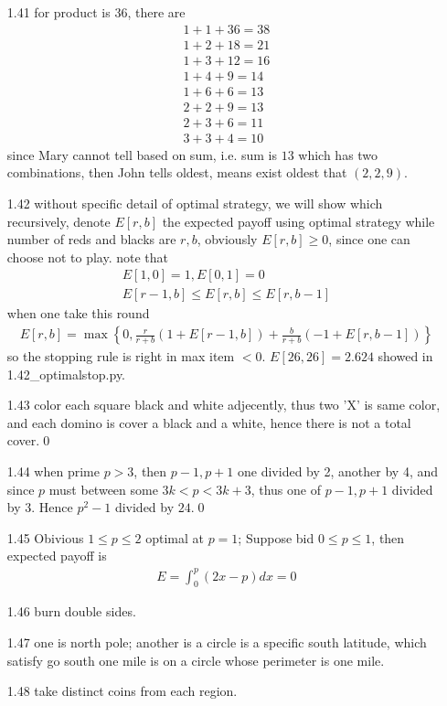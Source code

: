\documentclass[paper=a4, fontsize=11pt]{scrartcl} %
\numberwithin{equation}{section} %
\numberwithin{figure}{section} %
\numberwithin{table}{section} %
\begin{document}
\begin{itemize}
	\item[1.41] for product is 36, there are 
	\begin{align}
		1+1+36=38\\
		1+2+18=21\\
		1+3+12=16\\
		1+4+9=14\\
		1+6+6=13\\
		2+2+9=13\\
		2+3+6=11\\
		3+3+4=10
	\end{align}
	since Mary cannot tell based on sum, i.e. sum is $13$ which has two combinations, then John tells oldest, means exist oldest that $(2,2,9)$.
	\item[1.42] without specific detail of optimal strategy, we will show which recursively, denote $E[r,b]$ the expected payoff using optimal strategy while number of reds and blacks are $r,b$, obviously $E[r,b]\geq 0$, since one can choose not to play. note that
	\begin{align}
		E[1,0]=1, E[0,1]=0\\
		E[r-1,b]\leq E[r,b]\leq E[r,b-1]
	\end{align}	
	when one take this round
	\begin{align}
		E[r,b] = \max\left\{0, \frac{r}{r+b}\left(1+E[r-1,b]\right) + \frac{b}{r+b}\left(-1+E[r,b-1]\right)\right\}
	\end{align}
	so the stopping rule is right in max item $<0$. $E[26,26]= 2.624$ showed in 1.42\_optimalstop.py.
	\item[1.43] color each square black and white adjecently, thus two 'X' is same color, and each domino is cover a black and a white, hence there is not a total cover.\qed
	\item[1.44] when prime $p>3$, then $p-1,p+1$ one divided by 2, another by 4, and since $p$ must between some $3k<p<3k+3$, thus one of $p-1,p+1$ divided by 3. Hence $p^2-1$ divided by $24$.\qed
	\item[1.45] Obivious $1\leq p\leq 2$ optimal at $p=1$; Suppose bid $0\leq p\leq 1$, then expected payoff is
	\begin{align}
		E = \int_0^p (2x-p) dx =  0
	\end{align}
	\item[1.46] burn double sides.
	\item[1.47] one is north pole; another is a circle is a specific south latitude, which satisfy go south one mile is on a circle whose perimeter is one mile.
	\item[1.48] take distinct coins from each region.

\end{itemize}
\end{document}
